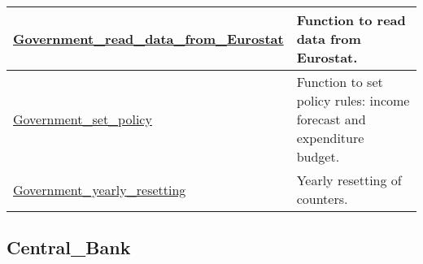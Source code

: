 \documentclass[a4paper,11pt]{article}
\begin{document}
\begin{landscape}
\begin{longtable}[H!]{ll}
\midrule
\url{Government_read_data_from_Eurostat} \index{\url{Government_read_data_from_Eurostat}} & \parbox{10cm}{Function to read data from Eurostat.} \\
\midrule
\url{Government_set_policy}  & \parbox{10cm}{Function to set policy rules: income forecast and expenditure budget.} \\
\midrule
\url{Government_yearly_resetting}  & \parbox{10cm}{Yearly resetting of counters.} \\
\end{longtable}
\end{landscape}



\clearpage
\subsection{Central\_Bank}
\end{document}
